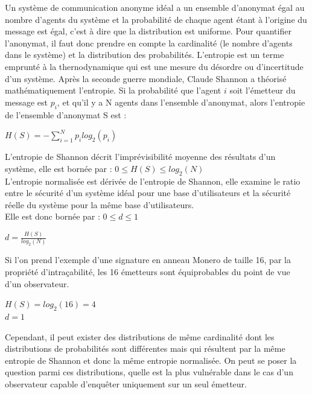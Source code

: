 Un système de communication anonyme idéal a un ensemble d'anonymat égal au nombre
d'agents du système et la probabilité de chaque agent étant à l'origine du message 
est égal, c'est à dire que la distribution est uniforme.
Pour quantifier l'anonymat, il faut donc prendre en compte la cardinalité 
(le nombre d'agents dans le système) et la distribution des probabilités.
L'entropie est un terme emprunté à la thernodynamique qui est une mesure du 
désordre ou d'incertitude d'un système. Après la seconde guerre mondiale, 
Claude Shannon a théorisé mathématiquement l'entropie.
Si la probabilité que l'agent $i$ soit l'émetteur du message est $p_i$,
et qu'il y a N agents dans l'ensemble d'anonymat, alors l'entropie de
l'ensemble d'anonymat S est :
\begin{definition}
    $H(S) = - \displaystyle\sum_{i=1}^N p_i log_2(p_i)$
\end{definition}

L'entropie de Shannon décrit l'imprévisibilité moyenne des résultats d'un système,
elle est bornée par : $0 \leq H(S) \leq log_2(N)$\\

L'entropie normalisée est dérivée de l'entropie de Shannon, 
elle examine le ratio entre le sécurité d'un système idéal 
pour une base d'utilisateurs et la sécurité réelle du système 
pour la même base d'utilisateurs.\\
Elle est donc bornée par : $0 \leq d \leq 1$

\begin{definition}
    $d=\frac{H(S)}{log_2(N)}$
\end{definition}

\bigskip 
\noindent 

Si l'on prend l'exemple d'une signature en anneau Monero de taille 16,
par la propriété d'intraçabilité, les 16 émetteurs sont équiprobables 
du point de vue d'un observateur.

\medskip 
\noindent
$H(S) = log_2(16) = 4$\\
$d=1$

\medskip 
\noindent
Cependant, il peut exister des distributions de même cardinalité dont les distributions de 
probabilités sont différentes mais qui résultent par la même entropie de Shannon et 
donc la même entropie normalisée. On peut se poser la question parmi ces distributions, 
quelle est la plus vulnérable dans le cas d'un observateur capable d'enquêter uniquement 
sur un seul émetteur. 

